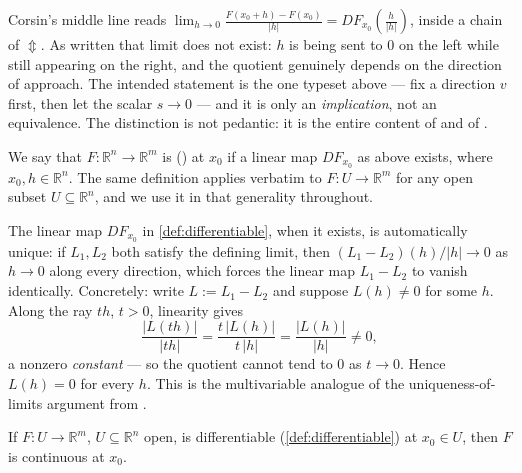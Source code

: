 \begin{ainote}
Corsin's middle line reads
$\lim_{h\to0}\frac{F(x_0+h)-F(x_0)}{|h|} = DF_{x_0}\!\left(\frac{h}{|h|}\right)$, inside a chain
of $\Updownarrow$. As written that limit does not exist: $h$ is being sent to $0$ on the left
while still appearing on the right, and the quotient genuinely depends on the direction of
approach. The intended statement is the one typeset above --- fix a direction $v$ first, then
let the scalar $s \to 0$ --- and it is only an \emph{implication}, not an equivalence. The
distinction is not pedantic: it is the entire content of
 and of
.
\end{ainote}

\begin{definition}[Differentiability]
\label{def:differentiable}
We say that $F : \mathbb{R}^n \to \mathbb{R}^m$ is 
() at $x_0$ if a linear map $DF_{x_0}$ as above exists, where
$x_0, h \in \mathbb{R}^n$. The same definition applies verbatim to $F : U \to \mathbb{R}^m$
for any open subset $U \subseteq \mathbb{R}^n$, and we use it in that generality throughout.
\end{definition}

\begin{remark}
The linear map $DF_{x_0}$ in \cref{def:differentiable}, when it exists, is automatically unique:
if $L_1, L_2$ both satisfy the defining limit, then
$(L_1-L_2)(h)/|h| \to 0$ as $h \to 0$ along every direction, which forces the linear map
$L_1 - L_2$ to vanish identically. Concretely: write $L := L_1-L_2$ and suppose $L(h) \neq 0$
for some $h$. Along the ray $th$, $t > 0$, linearity gives
\[\frac{|L(th)|}{|th|} = \frac{t\,|L(h)|}{t\,|h|} = \frac{|L(h)|}{|h|} \neq 0,\]
a nonzero \emph{constant} --- so the quotient cannot tend to $0$ as $t \to 0$. Hence $L(h)=0$
for every $h$. This
is the multivariable analogue of the uniqueness-of-limits argument from
.
\end{remark}

\begin{proposition}
\label{prop:differentiable_implies_continuous}
If $F : U \to \mathbb{R}^m$, $U \subseteq \mathbb{R}^n$ open, is differentiable
(\cref{def:differentiable}) at $x_0 \in U$, then $F$ is continuous at $x_0$.
\end{proposition}

